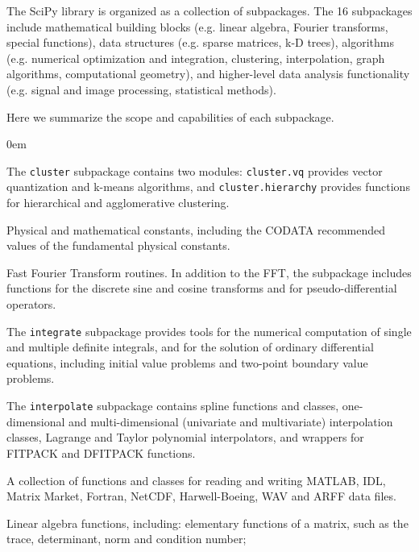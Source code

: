 The SciPy library is organized as a collection of subpackages.  The 16
subpackages include mathematical building blocks (e.g. linear algebra, Fourier
transforms, special functions), data structures (e.g. sparse matrices, k-D trees),
algorithms (e.g. numerical optimization and integration, clustering, interpolation,
graph algorithms, computational geometry), and higher-level data analysis
functionality (e.g. signal and image processing, statistical methods).

Here we summarize the scope and capabilities of each subpackage.

\begin{description}[leftmargin=!, labelwidth=\widthof{\bfseries \texttt{interpolate}}]
\itemsep0em
\item[\texttt{cluster}]
    The \texttt{cluster} subpackage contains two modules:
    \texttt{cluster.vq} provides vector quantization and k-means algorithms,
    and \texttt{cluster.hierarchy} provides functions for hierarchical and
    agglomerative clustering.
\item[\texttt{constants}]
    Physical and mathematical constants, including the CODATA recommended
    values of the fundamental physical constants\cite{CODATA2014}.
\item[\texttt{fftpack}]
    Fast Fourier Transform routines.  In addition to the FFT, the subpackage
    includes functions for the discrete sine and cosine transforms and for
    pseudo-differential operators.
\item[\texttt{integrate}]
    The \texttt{integrate} subpackage provides tools for the numerical
    computation of single and multiple definite integrals, and for the
    solution of ordinary differential equations, including initial value
    problems and two-point boundary value problems.
\item[\texttt{interpolate}]
    The \texttt{interpolate} subpackage contains spline functions and
    classes, one-dimensional and multi-dimensional (univariate and
    multivariate) interpolation classes, Lagrange and Taylor polynomial
    interpolators, and wrappers for FITPACK and DFITPACK functions.
\item[\texttt{io}]
    A collection of functions and classes for reading and writing MATLAB, IDL,
    Matrix Market, Fortran, NetCDF, Harwell-Boeing, WAV and ARFF data files. 
\item[\texttt{linalg}]
    Linear algebra functions, including:
    elementary functions of a matrix, such as the trace, determinant, norm and
    condition number;

\end{description}

